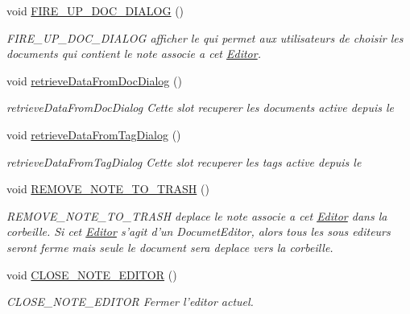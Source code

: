 \begin{DoxyCompactItemize}
void \hyperlink{class_editor_a11709e3767a95758926bfeac6b466b33}{F\-I\-R\-E\-\_\-\-U\-P\-\_\-\-D\-O\-C\-\_\-\-D\-I\-A\-L\-O\-G} ()
\begin{DoxyCompactList}\small\item\em F\-I\-R\-E\-\_\-\-U\-P\-\_\-\-D\-O\-C\-\_\-\-D\-I\-A\-L\-O\-G afficher le  qui permet aux utilisateurs de choisir les documents qui contient le note associe a cet \hyperlink{class_editor}{Editor}. \end{DoxyCompactList}\item 
void \hyperlink{class_editor_a308e57b5ee6350add0bab469394fff8e}{retrieve\-Data\-From\-Doc\-Dialog} ()
\begin{DoxyCompactList}\small\item\em retrieve\-Data\-From\-Doc\-Dialog Cette slot recuperer les documents active depuis le  \end{DoxyCompactList}\item 
void \hyperlink{class_editor_a74bb993deeff8d74af33b374d4f365ee}{retrieve\-Data\-From\-Tag\-Dialog} ()
\begin{DoxyCompactList}\small\item\em retrieve\-Data\-From\-Tag\-Dialog Cette slot recuperer les tags active depuis le  \end{DoxyCompactList}\item 
void \hyperlink{class_editor_ac453d5a5c1966076fc272ec0a097b18f}{R\-E\-M\-O\-V\-E\-\_\-\-N\-O\-T\-E\-\_\-\-T\-O\-\_\-\-T\-R\-A\-S\-H} ()
\begin{DoxyCompactList}\small\item\em R\-E\-M\-O\-V\-E\-\_\-\-N\-O\-T\-E\-\_\-\-T\-O\-\_\-\-T\-R\-A\-S\-H deplace le note associe a cet \hyperlink{class_editor}{Editor} dans la corbeille. Si cet \hyperlink{class_editor}{Editor} s'agit d'un Documet\-Editor, alors tous les sous editeurs seront ferme mais seule le document sera deplace vers la corbeille. \end{DoxyCompactList}\item 
void \hyperlink{class_editor_a90ab139e710ab4e437bf3ce3a17043e8}{C\-L\-O\-S\-E\-\_\-\-N\-O\-T\-E\-\_\-\-E\-D\-I\-T\-O\-R} ()
\begin{DoxyCompactList}\small\item\em C\-L\-O\-S\-E\-\_\-\-N\-O\-T\-E\-\_\-\-E\-D\-I\-T\-O\-R Fermer l'editor actuel. \end{DoxyCompactList}\end{DoxyCompactItemize}
